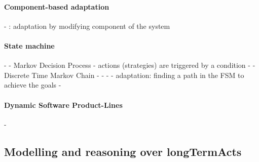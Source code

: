 \paragraph{Component-based adaptation}
- \cite{DBLP:conf/soco/DavidL06}: adaptation by modifying component of the system

\paragraph{State machine}
- \cite{DBLP:conf/sigsoft/MorenoCGS15}
	- Markov Decision Process
	- actions (strategies) are triggered by a condition
- \cite{DBLP:conf/kbse/FilieriGLM11}
	- Discrete Time Markov Chain
- \cite{DBLP:conf/wetice/DjoudiBZ14}
- \cite{DBLP:conf/aosd/ZhangGC09}
- \cite{DBLP:conf/icse/GhezziPST13}
	- adaptation: finding a path in the FSM to achieve the goals
- \cite{DBLP:conf/kbse/TajalliGEM10}

\paragraph{Dynamic Software Product-Lines}
- \cite{DBLP:conf/dagstuhl/GhezziS10}


	


\subsection[Modelling and reasoning over long-term actions]{Modelling and reasoning over \glspl{longTermAct}}